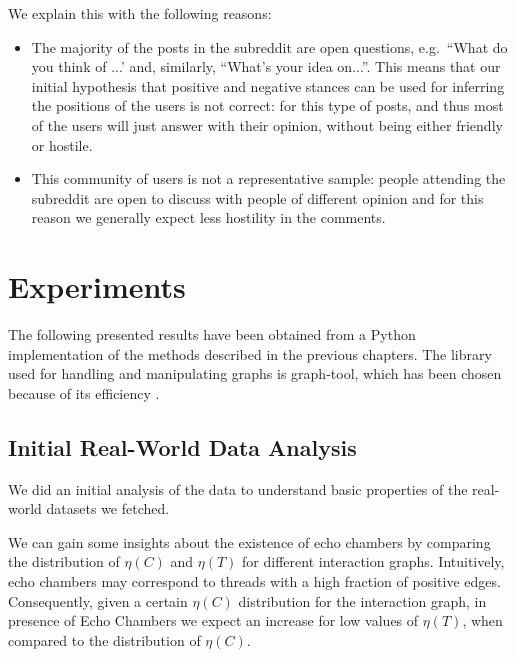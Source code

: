 We explain this with the following reasons:
\begin{itemize}
	\item The majority of the posts in the subreddit are open questions, e.g.\ ``What
	      do you think of ...' and, similarly, ``What's your idea on...''. This
	      means that our initial hypothesis that positive and negative
	      stances can be used for inferring the positions of
	      the users is not correct: for this type of posts, and thus most of the users
	      will just answer with their opinion, without being either friendly or
	      hostile.
	\item This community of users is not a representative sample: people attending
	      the subreddit are open to discuss with people of different opinion
	      and for this reason we generally expect less hostility in the
	      comments.
\end{itemize}
\section{Experiments}

The following presented results have been obtained from a Python
implementation of the methods described in the previous chapters. The library used
for handling and manipulating graphs is graph-tool, which has been chosen
because of its efficiency \cite{peixoto_graph-tool_2014}.

\subsection{Initial Real-World Data Analysis}%
\label{sub:validity_problem_definition}

We did an initial analysis of the data to understand basic properties of the
real-world datasets we fetched.

We can gain some insights about the existence of echo chambers by comparing
the distribution of $\eta(C)$ and $\eta(T)$ for different interaction graphs.
Intuitively, echo chambers may correspond to threads with a
high fraction of positive edges. Consequently, given a certain $\eta(C)$
distribution for the interaction graph, in presence of Echo Chambers we expect
an increase for low values of $\eta(T)$, when compared to the distribution of
$\eta(C)$.

